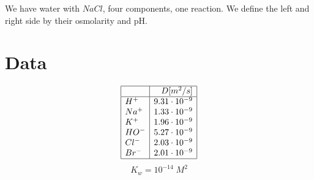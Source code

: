 \documentclass[aps,12pt]{revtex4}
\begin{document}
We have water with $NaCl$, four components, one reaction.
We define the left and right side by their osmolarity and pH.



\section{Data}

\begin{equation}
\begin{array}{|l|r|}
\hline
 \text{} & D[m^2/s]  \\
 \hline
 	H^+	 & 9.31\cdot10^{-9}	\\
 	Na^+ & 1.33\cdot10^{-9}	 \\
 	K^+	 & 1.96\cdot10^{-9}	 \\
 	HO^- & 5.27\cdot10^{-9}	 \\
 	Cl^- & 2.03\cdot10^{-9} \\
 	Br^- & 2.01\cdot10^{-9} \\
\hline
\end{array}
\end{equation}
$$
	K_w = 10^{-14}\; M^2
$$
\end{document}

